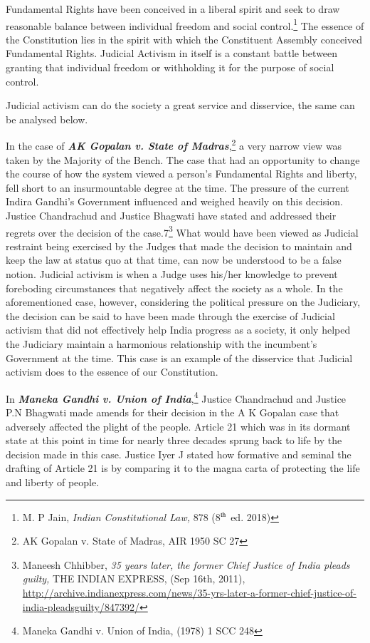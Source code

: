 \begin{multicols}{2}

\noi
Fundamental Rights have been conceived in a liberal spirit and seek to draw reasonable
balance between individual freedom and social control.\footnote{M. P Jain, \textit{Indian Constitutional Law,} 878 (8$^{\rm th}$ ed. 2018)}
 The essence of the Constitution lies in the spirit with which the Constituent Assembly conceived Fundamental Rights. Judicial
Activism in itself is a constant battle between granting that individual freedom or withholding
it for the purpose of social control. 

\noi
Judicial activism can do the society a great service and disservice, the same can be analysed
below.

\noi
In the case of \textbf{\textit{AK Gopalan v. State of Madras}},\footnote{AK Gopalan v. State of Madras, AIR 1950 SC 27}  a very narrow view was taken by the
Majority of the Bench. The case that had an opportunity to change the course of how the
system viewed a person’s Fundamental Rights and liberty, fell short to an insurmountable
degree at the time. The pressure of the current Indira Gandhi’s Government influenced and
weighed heavily on this decision. Justice Chandrachud and Justice Bhagwati have stated and
addressed their regrets over the decision of the case.7\footnote{Maneesh Chhibber, \textit{35 years later, the former Chief Justice of India pleads guilty,} THE INDIAN EXPRESS, (Sep 16th, 2011), \url{http://archive.indianexpress.com/news/35-yrs-later-a-former-chief-justice-of-india-pleadsguilty/847392/}}  What would have been viewed as Judicial restraint being exercised by the Judges that made the decision to maintain and keep
the law at status quo at that time, can now be understood to be a false notion. Judicial
activism is when a Judge uses his/her knowledge to prevent foreboding circumstances that
negatively affect the society as a whole. In the aforementioned case, however, considering the
political pressure on the Judiciary, the decision can be said to have been made through the
exercise of Judicial activism that did not effectively help India progress as a society, it only
helped the Judiciary maintain a harmonious relationship with the incumbent’s Government at
the time. This case is an example of the disservice that Judicial activism does to the essence
of our Constitution.

\noi
In \textbf{\textit{Maneka Gandhi v. Union of India}},\footnote{Maneka Gandhi v. Union of India, (1978) 1 SCC 248}  Justice Chandrachud and Justice P.N Bhagwati made
amends for their decision in the A K Gopalan case that adversely affected the plight of the
people. Article 21 which was in its dormant state at this point in time for nearly three decades
sprung back to life by the decision made in this case. Justice Iyer J stated how formative and seminal the drafting of Article 21 is by comparing it to the magna carta of protecting the life
and liberty of people.


\end{multicols}
